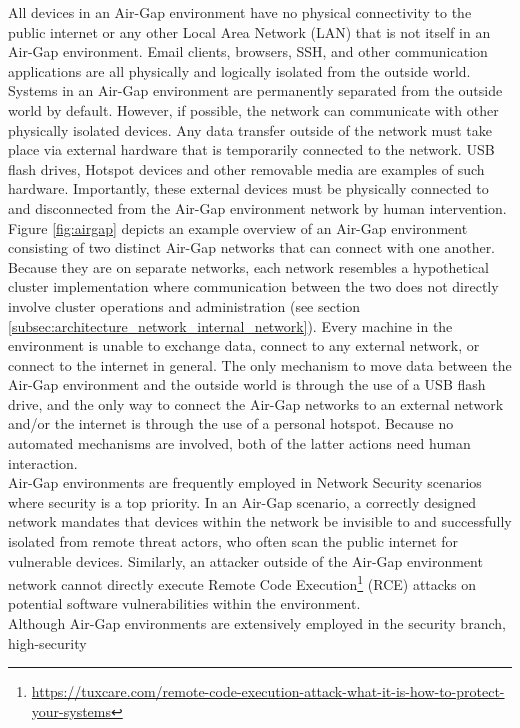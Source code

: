 All devices in an Air-Gap environment have no physical connectivity to the public
internet or any other Local Area Network (LAN) that is not itself in an Air-Gap environment.
Email clients, browsers, SSH, and other communication applications are all physically
and logically isolated from the outside world. \\ %
Systems in an Air-Gap environment are permanently separated from the outside world
by default. However, if possible, the network can communicate with other
physically isolated devices. Any data transfer outside of the network must take place
via external hardware that is temporarily connected to the network. USB flash
drives, Hotspot devices and other removable media are examples of such hardware.
Importantly, these external devices must be physically connected to and disconnected
from the Air-Gap environment network by human intervention. \\ %
Figure \ref{fig:airgap} depicts an example overview of an Air-Gap environment consisting
of two distinct Air-Gap networks that can connect with one another. Because they
are on separate networks, each network resembles a hypothetical cluster implementation
where communication between the two does not directly involve cluster operations
and administration (see section
\ref{subsec:architecture_network_internal_network}). Every machine in the
environment is unable to exchange data, connect to any external network, or
connect to the internet in general. The only mechanism to move data between the Air-Gap
environment and the outside world is through the use of a USB flash drive, and
the only way to connect the Air-Gap networks to an external network and/or the
internet is through the use of a personal hotspot. Because no automated mechanisms
are involved, both of the latter actions need human interaction. \\ %
Air-Gap environments are frequently employed in Network Security scenarios where
security is a top priority. In an Air-Gap scenario, a correctly designed network
mandates that devices within the network be invisible to and successfully
isolated from remote threat actors, who often scan the public internet for vulnerable
devices. Similarly, an attacker outside of the Air-Gap environment network cannot
directly execute Remote Code Execution\footnote{\url{https://tuxcare.com/remote-code-execution-attack-what-it-is-how-to-protect-your-systems}}
(RCE) attacks on potential software vulnerabilities within the environment\cite{airgap}.
\\ %
Although Air-Gap environments are extensively employed in the security branch, high-security

